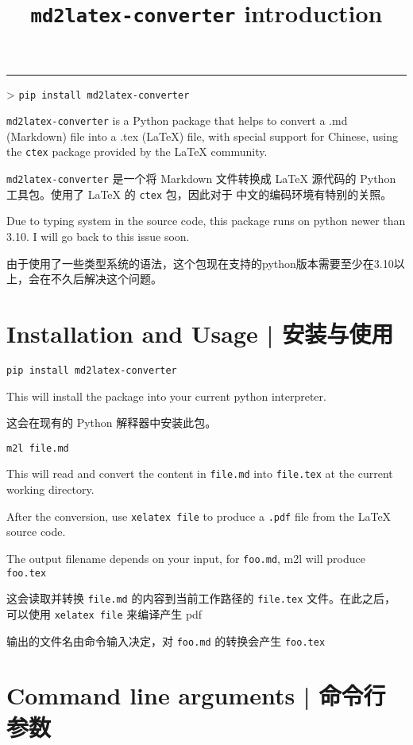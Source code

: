 \documentclass{ctexart}
\title{\texttt{md2latex-converter} introduction }
\begin{document}
	\maketitle


\noindent\rule{\textwidth}{1pt}


	> \texttt{pip install md2latex-converter}

	\texttt{md2latex-converter} is a Python package that helps to convert a .md (Markdown) file into a .tex (LaTeX) file, with special support for Chinese, using the \texttt{ctex} package provided by the LaTeX community.

	\texttt{md2latex-converter} 是一个将 Markdown 文件转换成 LaTeX 源代码的 Python 工具包。使用了 LaTeX 的 \texttt{ctex} 包，因此对于 中文的编码环境有特别的关照。

	Due to typing system in the source code, this package runs on python newer than 3.10. I will go back to this issue soon.

	由于使用了一些类型系统的语法，这个包现在支持的python版本需要至少在3.10以上，会在不久后解决这个问题。

	\section{Installation and Usage | 安装与使用}

	\texttt{pip install md2latex-converter}

	This will install the package into your current python interpreter.

	这会在现有的 Python 解释器中安装此包。

	\texttt{m2l file.md}

	This will read and convert the content in \texttt{file.md} into \texttt{file.tex} at the current working directory.

	After the conversion, use \texttt{xelatex file} to produce a \texttt{.pdf} file from the LaTeX source code.

	The output filename depends on your input, for \texttt{foo.md}, m2l will produce \texttt{foo.tex}

	这会读取并转换 \texttt{file.md} 的内容到当前工作路径的 \texttt{file.tex} 文件。在此之后，可以使用 \texttt{xelatex file} 来编译产生 pdf

	输出的文件名由命令输入决定，对 \texttt{foo.md} 的转换会产生 \texttt{foo.tex}

	\section{Command line arguments | 命令行参数}
\end{document}
